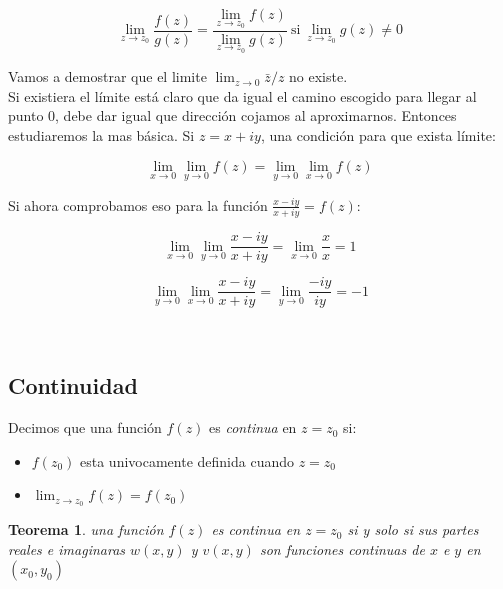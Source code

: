 \documentclass[12pt]{book}
\newtheorem{theorem}{Teorema}[section]
\begin{document}
\begin{equation}
\lim_{z \rightarrow z_0}  \dfrac{f(z)}{g(z)} = \dfrac{\lim_{z \rightarrow z_0}  f(z)}{\lim_{z \rightarrow z_0} g(z)} \ \mathrm{si} \ \lim_{z \rightarrow z_0} g(z) \neq 0
\end{equation}




\hrulefill

Vamos a demostrar que el limite  $\lim_{z \rightarrow 0} \bar{z}/z$ no existe. \\

Si existiera el límite está claro que da igual el camino escogido para llegar al punto 0, debe dar igual que dirección cojamos al aproximarnos. Entonces estudiaremos la mas básica. Si $z=x+iy$, una condición para que exista límite: 

\begin{equation}
\lim_{x \rightarrow 0} \lim_{y \rightarrow 0} f(z) = \lim_{y \rightarrow 0} \lim_{x \rightarrow 0} f(z)
\end{equation}

Si ahora comprobamos eso para la función $\frac{x-iy}{x+iy}=f(z)$:

$$ \lim_{x \rightarrow 0} \lim_{y \rightarrow 0} \frac{x-iy}{x+iy} = \lim_{x \rightarrow 0} \dfrac{x}{x} = 1 $$

$$ \lim_{y \rightarrow 0} \lim_{x \rightarrow 0} \frac{x-iy}{x+iy} =  \lim_{y \rightarrow 0} \frac{-iy}{iy} = -1 $$

\hrulefill \\


\subsection*{Continuidad}

Decimos que una función $f(z)$ es \textit{continua} en $z=z_0$ si:

\begin{itemize}
\item $f(z_0)$ esta univocamente definida cuando $z=z_0$

\item $\lim_{z \rightarrow z_0} f(z) = f(z_0)$
\end{itemize} 

\begin{theorem}
 una función $f(z)$ es continua en $z=z_0$ si y solo si sus partes reales e imaginaras $w(x,y)$ y $v(x,y)$ son funciones continuas de $x$ e $y$ en $(x_0,y_0)$
\end{theorem}
\end{document}
